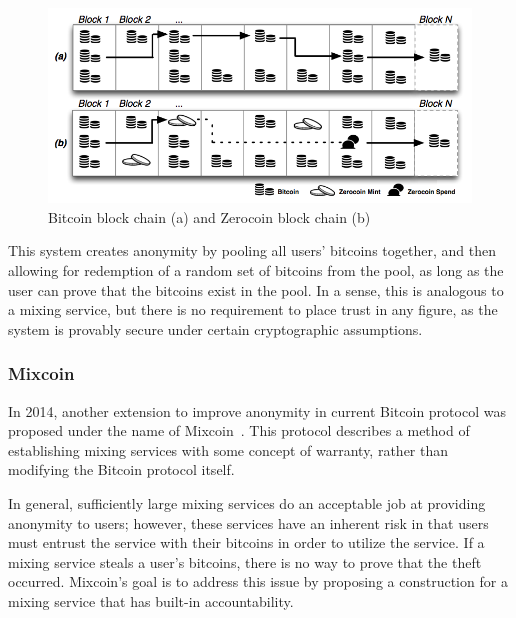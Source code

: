 \documentclass[11pt]{article}
\begin{document}
\begin{figure}[H]
    \centering
    \caption[Bitcoin block chain (a) and Zerocoin block chain (b)]{Bitcoin block
        chain (a) and Zerocoin block chain (b)~\cite{miers13}}
    \includegraphics[width=\linewidth]{figures/zerocoin.png}
\end{figure}

This system creates anonymity by pooling all users' bitcoins together, and then
allowing for redemption of a random set of bitcoins from the pool, as long as
the user can prove that the bitcoins exist in the pool. In a sense, this is
analogous to a mixing service, but there is no requirement to place trust in any
figure, as the system is provably secure under certain cryptographic
assumptions.

\subsubsection{Mixcoin}
In 2014, another extension to improve anonymity in current Bitcoin protocol
was proposed under the name of Mixcoin~\cite{bonneau14}. This protocol
describes a method of establishing mixing services with some concept of
warranty, rather than modifying the Bitcoin protocol itself.

In general, sufficiently large mixing services do an acceptable job at providing
anonymity to users; however, these services have an inherent risk in that users
must entrust the service with their bitcoins in order to utilize the service.
If a mixing service steals a user's bitcoins, there is no way to prove that the
theft occurred. Mixcoin's goal is to address this issue by proposing a
construction for a mixing service that has built-in accountability.
\end{document}
